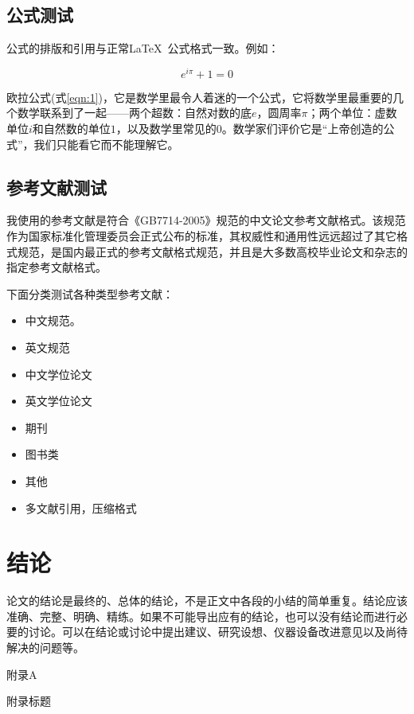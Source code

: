 \documentclass{bjtuthesis}
\begin{document}
\section{公式测试}
公式的排版和引用与正常\LaTeX\ 公式格式一致。例如：

\begin{equation}
\label{eqn:1}
e^{i\pi}+1=0
\end{equation}

欧拉公式(式\ref{eqn:1})，它是数学里最令人着迷的一个公式，它将数学里最重要的几个数学联系到了一起——两个超数：自然对数的底$e$，圆周率$\pi$；两个单位：虚数单位$i$和自然数的单位$1$，以及数学里常见的$0$。数学家们评价它是“上帝创造的公式”，我们只能看它而不能理解它。

\section{参考文献测试}
我使用的参考文献是符合《GB7714-2005》规范的中文论文参考文献格式。该规范作为国家标准化管理委员会正式公布的标准，其权威性和通用性远远超过了其它格式规范，是国内最正式的参考文献格式规范，并且是大多数高校毕业论文和杂志的指定参考文献格式。

下面分类测试各种类型参考文献：

\begin{itemize}
\item 中文规范\citep{C1}。
\item 英文规范\citep{ACI318}
\item 中文学位论文\citep{liguiqian}
\item 英文学位论文\citep{bentz2000}
\item 期刊\citep{FMK}
\item 图书类\citep{B1}
\item 其他\citep{R1}
\item 多文献引用，压缩格式\citep{C1,ACI318,liguiqian,R1}
\end{itemize}

\chapter{结论}
论文的结论是最终的、总体的结论，不是正文中各段的小结的简单重复。结论应该准确、完整、明确、精练。如果不可能导出应有的结论，也可以没有结论而进行必要的讨论。可以在结论或讨论中提出建议、研究设想、仪器设备改进意见以及尚待解决的问题等。

\cleardoublepage 
\begin{center}
{\heiti 附录A}
\end{center}
\begin{center}
{\heiti 附录标题}
\end{center}
\end{document}

